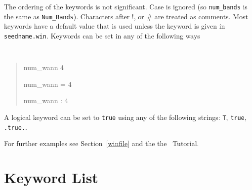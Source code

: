 The ordering of the keywords is not significant. Case is ignored (so
\verb#num_bands# is the same as \verb#Num_Bands#). Characters after !, or \#
are treated as comments. Most keywords have a default value that is
used unless the keyword is given in {\tt seedname.win}. Keywords can be set
in any of the following ways
{\tt
\begin{quote}
num\_wann   4

num\_wann = 4

num\_wann : 4
\end{quote} }
A logical keyword can be set to {\tt true} using any of the following
strings: {\tt T}, {\tt true}, {\tt .true.}.

For further examples see Section~\ref{winfile} and the the \wannier\ Tutorial.


\section{Keyword List}
\label{parameter_data}

